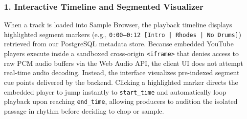 \subsubsection*{1. Interactive Timeline and Segmented Visualizer}
When a track is loaded into Sample Browser, the playback timeline displays highlighted segment markers (e.g., \texttt{0:00--0:12 [Intro | Rhodes | No Drums]}) retrieved from our PostgreSQL metadata store. Because embedded YouTube players execute inside a sandboxed cross-origin \texttt{<iframe>} that denies access to raw PCM audio buffers via the Web Audio API, the client UI does not attempt real-time audio decoding. Instead, the interface visualizes pre-indexed segment cue points delivered by the backend. Clicking a highlighted marker directs the embedded player to jump instantly to \texttt{start\_time} and automatically loop playback upon reaching \texttt{end\_time}, allowing producers to audition the isolated passage in rhythm before deciding to chop or sample.

